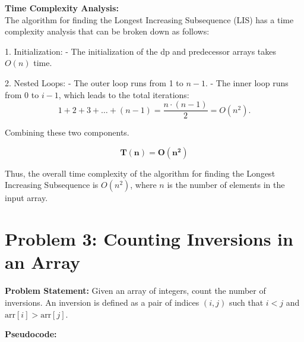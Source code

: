 \documentclass[a4paper,12pt]{report}
\begin{document}
\large \textbf{Time Complexity Analysis:} \hfill \\

The algorithm for finding the Longest Increasing Subsequence (LIS) has a time complexity analysis that can be broken down as follows:

1. Initialization: 
   - The initialization of the dp and predecessor arrays takes \(O(n)\) time.

2. Nested Loops: 
   - The outer loop runs from 1 to \(n-1\).
   - The inner loop runs from 0 to \(i-1\), which leads to the total iterations:
     \[
     1 + 2 + 3 + \ldots + (n-1) = \frac{n \cdot (n - 1)}{2} = O(n^2).
     \]

Combining these two components.
\begin{tcolorbox}[colback=white, colframe=black, boxrule=0.5pt] %
\[
\mathbf{T(n) = O(n^2)}
\]
\end{tcolorbox}

Thus, the overall time complexity of the algorithm for finding the Longest Increasing Subsequence is \(O(n^2)\), where \(n\) is the number of elements in the input array.

\newpage
\section*{Problem 3: Counting Inversions in an Array}

\textbf{Problem Statement:}  
Given an array of integers, count the number of inversions. An inversion is defined as a pair of indices \((i, j)\) such that \(i < j\) and \(\text{arr}[i] > \text{arr}[j]\).

\textbf{Pseudocode:}
\end{document}
